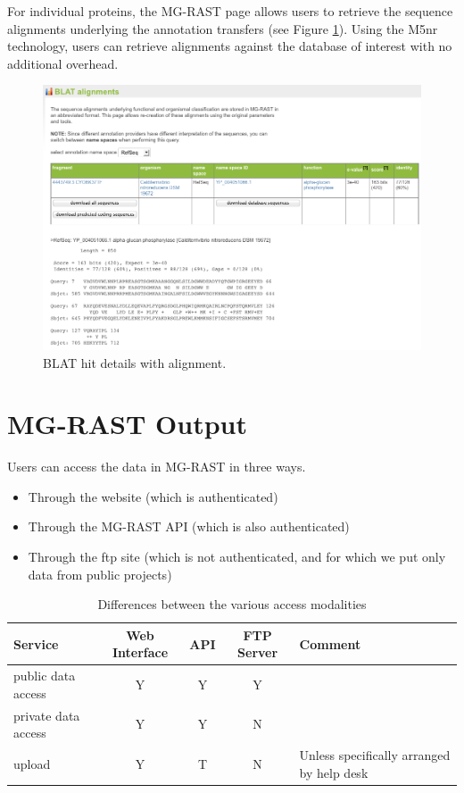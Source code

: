 \documentclass[12pt,fullpage]{report}
\begin{document}
For individual proteins, the MG-RAST page allows users to retrieve the sequence alignments underlying the annotation transfers (see Figure \ref{fig:blat-alignment}).
Using the M5nr \cite{M5NR} technology, users can retrieve alignments against the database of interest with no additional overhead.

\begin{figure}[ht]
\begin{center}
\includegraphics[width=6in]{Images/blat-alignment.png}
\end{center}
\caption{
BLAT hit details with alignment.
}
\label{fig:blat-alignment}
\end{figure}
\section{MG-RAST Output}

Users can access the data in MG-RAST in three ways.
\begin{itemize}
\item Through the website (which is authenticated)
\item Through the MG-RAST API (which is also authenticated)
\item Through the ftp site (which is not authenticated, and for which we put
only data from public projects)
\end{itemize}

\begin{table}
\caption{Differences between the various access modalities}
\label{table:access-modalities}
\begin{tabular}{l|c|c|c|l}
Service & Web Interface & API & FTP Server & Comment\\
 \hline
public data  access  	  &  Y                   &  Y     &  Y &\\
private data  access   &  Y                   &  Y     &  N &\\
upload                      &  Y                    &  T     & N & Unless specifically arranged by help desk\\
 \hline
\end{tabular}
\end{table}
\end{document}
